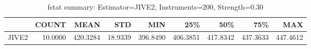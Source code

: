 \begin{table}[ht]
\centering
\caption{fstat summary: Estimator=JIVE2, Instruments=200, Strength=0.30}
\begin{tabular}{lrrrrrrrr}
\toprule
 & COUNT & MEAN & STD & MIN & 25\% & 50\% & 75\% & MAX \\
\midrule
JIVE2 & 10.0000 & 420.3284 & 18.9339 & 396.8490 & 406.3851 & 417.8342 & 437.3633 & 447.4612 \\
\bottomrule
\end{tabular}
\end{table}
